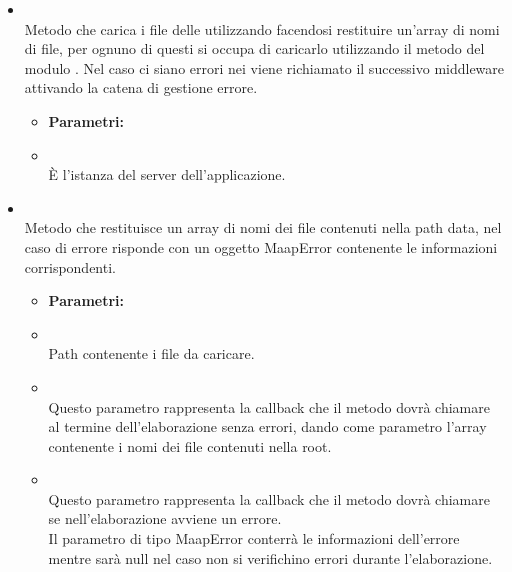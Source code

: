 \begin{itemize}
\item[] \textbf{} \\ Metodo che carica i file  delle  utilizzando  facendosi restituire un'array di nomi di file, per ognuno di questi si occupa di caricarlo utilizzando il metodo  del modulo . Nel caso ci siano errori nei  viene richiamato il successivo middleware attivando la catena di gestione errore.
\begin{itemize}\addtolength{\itemsep}{-0.5\baselineskip}
\item[] \textbf{Parametri:}
\item[]  \\ È l'istanza del server dell'applicazione.
\end{itemize}
\item[] \textbf{} \\ Metodo che restituisce un array di nomi dei file contenuti nella path  data, nel caso di errore risponde con un oggetto MaapError contenente le informazioni corrispondenti.
\begin{itemize}\addtolength{\itemsep}{-0.5\baselineskip}
\item[] \textbf{Parametri:}
\item[]  \\ Path contenente i file  da caricare.
\item[]  \\ Questo parametro rappresenta la callback che il metodo dovrà chiamare al termine dell'elaborazione senza errori, dando come parametro l'array contenente i nomi dei file contenuti nella root.
\item[]  \\ Questo parametro rappresenta la callback che il metodo dovrà chiamare se nell'elaborazione avviene un errore. \\ Il parametro di tipo MaapError conterrà le informazioni dell'errore mentre sarà null nel caso non si verifichino errori durante l'elaborazione.
\end{itemize}
\end{itemize}

